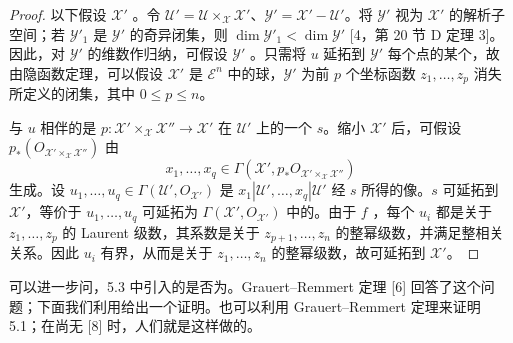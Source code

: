 \begin{proof}
以下假设 $\mathcal X'$ 。令 $\mathcal U'=\mathcal U\times_{\mathcal X}\mathcal X'$、$\mathcal Y'=\mathcal X'-\mathcal U'$。将 $\mathcal Y'$ 视为 $\mathcal X'$ 的解析子空间；若 $\mathcal Y'_1$ 是 $\mathcal Y'$ 的奇异闭集，则 $\dim\mathcal Y'_1<\dim\mathcal Y'$ [4，第 20 节 D 定理 3]。因此，对 $\mathcal Y'$ 的维数作归纳，可假设 $\mathcal Y'$ 。只需将 $u$ 延拓到 $\mathcal Y'$ 每个点的某个，故由隐函数定理，可以假设
$\mathcal X'$ 是 $\mathcal E^n$ 中的球，$\mathcal Y'$ 为前 $p$ 个坐标函数 $z_1,\ldots,z_p$ 消失所定义的闭集，其中 $0\leq p\leq n$。

与 $u$ 相伴的是 $p:\mathcal X'\times_{\mathcal X}\mathcal X''\to\mathcal X'$ 在 $\mathcal U'$ 上的一个 $s$。缩小 $\mathcal X'$ 后，可假设 $p_*(O_{\mathcal X'\times_{\mathcal X}\mathcal X''})$ 由
\[
x_1,\ldots,x_q\in\Gamma(\mathcal X',p_*O_{\mathcal X'\times_{\mathcal X}\mathcal X''})
\]
生成。设 $u_1,\ldots,u_q\in\Gamma(\mathcal U',O_{\mathcal X'})$ 是 $x_1|\mathcal U',\ldots,x_q|\mathcal U'$ 经 $s$ 所得的像。$s$ 可延拓到 $\mathcal X'$，等价于 $u_1,\ldots,u_q$ 可延拓为 $\Gamma(\mathcal X',O_{\mathcal X'})$ 中的。由于 $f$ ，每个 $u_i$ 都是关于 $z_1,\ldots,z_p$ 的 Laurent 级数，其系数是关于 $z_{p+1},\ldots,z_n$ 的整幂级数，并满足整相关关系。因此 $u_i$ 有界，从而是关于 $z_1,\ldots,z_n$ 的整幂级数，故可延拓到 $\mathcal X'$。
\end{proof}

可以进一步问，5.3 中引入的是否为。Grauert–Remmert 定理 [6] 回答了这个问题；下面我们利用给出一个证明。也可以利用 Grauert–Remmert 定理来证明 5.1；在尚无 [8] 时，人们就是这样做的。


